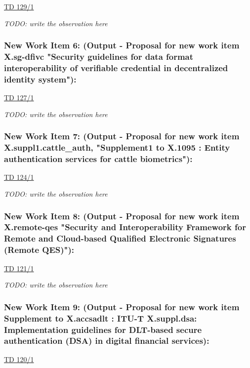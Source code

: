 \href{https://www.itu.int/md/meetingdoc.asp?lang=en\&parent=T25-SG17-251203-TD-WP1-0129}{TD 129/1}

\textit{TODO: write the observation here}

\subsubsection{New Work Item 6: (Output - Proposal for new work item X.sg-dfivc "Security guidelines for data format interoperability of verifiable credential in decentralized identity system"):}

\href{https://www.itu.int/md/meetingdoc.asp?lang=en\&parent=T25-SG17-251203-TD-WP1-0127}{TD 127/1}

\textit{TODO: write the observation here}

\subsubsection{New Work Item 7: (Output - Proposal for new work item X.suppl1.cattle\_auth, "Supplement1 to X.1095 : Entity authentication services for cattle biometrics"):}

\href{https://www.itu.int/md/meetingdoc.asp?lang=en\&parent=T25-SG17-251203-TD-WP1-0124}{TD 124/1}

\textit{TODO: write the observation here}

\subsubsection{New Work Item 8: (Output - Proposal for new work item X.remote-qes "Security and Interoperability Framework for Remote and Cloud-based Qualified Electronic Signatures (Remote QES)"):}

\href{https://www.itu.int/md/meetingdoc.asp?lang=en\&parent=T25-SG17-251203-TD-WP1-0121}{TD 121/1}

\textit{TODO: write the observation here}

\subsubsection{New Work Item 9: (Output - Proposal for new work item Supplement to X.accsadlt : ITU-T X.suppl.dsa: Implementation guidelines for DLT-based secure authentication (DSA) in digital financial services):}

\href{https://www.itu.int/md/meetingdoc.asp?lang=en\&parent=T25-SG17-251203-TD-WP1-0120}{TD 120/1}

